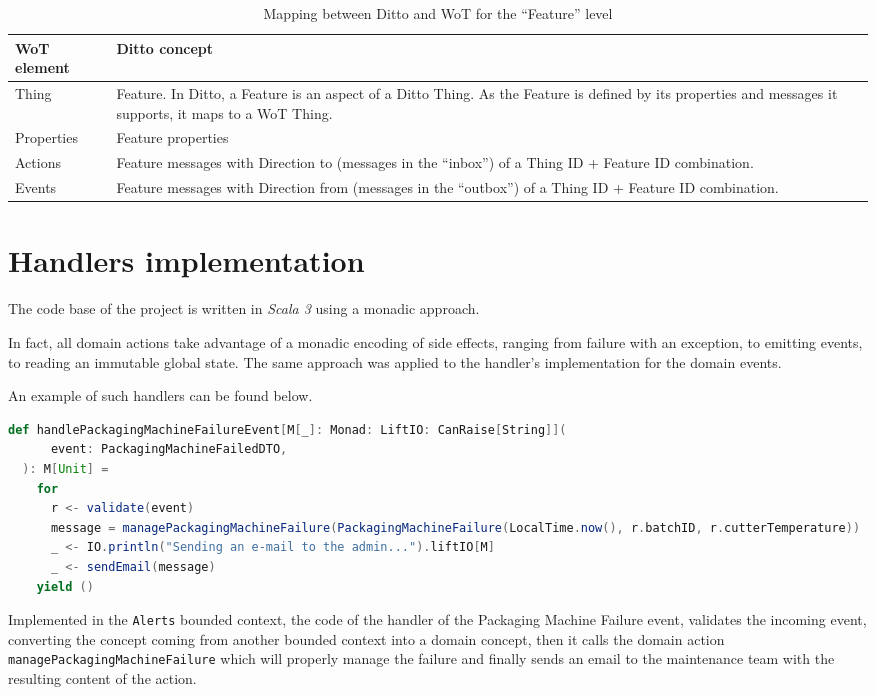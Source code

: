 \begin{table}[H]
    \begin{tabular}{|p{}|p{}|}
    \hline
    \textbf{WoT element} & \textbf{Ditto concept} \\ \hline
    Thing & Feature. In Ditto, a Feature is an aspect of a Ditto Thing. As the Feature is defined by its properties and messages it supports, it maps to a WoT Thing. \\ \hline
    Properties & Feature properties \\ \hline
    Actions &	Feature messages with Direction to (messages in the ``inbox'') of a Thing ID + Feature ID combination. \\ \hline
    Events &	Feature messages with Direction from (messages in the ``outbox'') of a Thing ID + Feature ID combination. \\ \hline
    \end{tabular}
    \caption{Mapping between Ditto and WoT for the ``Feature'' level}
    \label{tab:ditto-wot-feature}
\end{table}

\section{Handlers implementation}
The code base of the project is written in \textit{Scala 3} using a monadic approach.

In fact, all domain actions take advantage of a monadic encoding of side effects, ranging from failure with an exception, to emitting events, to reading an immutable global state.
The same approach was applied to the handler's implementation for the domain events.

An example of such handlers can be found below.

\begin{lstlisting}[language=Scala]
  def handlePackagingMachineFailureEvent[M[_]: Monad: LiftIO: CanRaise[String]](
      event: PackagingMachineFailedDTO,
  ): M[Unit] =
    for
      r <- validate(event)
      message = managePackagingMachineFailure(PackagingMachineFailure(LocalTime.now(), r.batchID, r.cutterTemperature))
      _ <- IO.println("Sending an e-mail to the admin...").liftIO[M]
      _ <- sendEmail(message)
    yield ()
\end{lstlisting}

Implemented in the \texttt{Alerts} bounded context, the code of the handler of the Packaging Machine Failure event, validates the incoming event, converting the concept coming from another bounded context into a domain concept, then it calls the domain action \texttt{managePackagingMachineFailure} which will properly manage the failure and finally sends an email to the maintenance team with the resulting content of the action.

